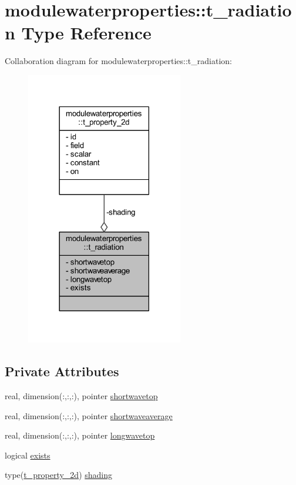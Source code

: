 \hypertarget{structmodulewaterproperties_1_1t__radiation}{}\section{modulewaterproperties\+:\+:t\+\_\+radiation Type Reference}
\label{structmodulewaterproperties_1_1t__radiation}


Collaboration diagram for modulewaterproperties\+:\+:t\+\_\+radiation\+:\nopagebreak
\begin{figure}[H]
\begin{center}
\leavevmode
\includegraphics[width=194pt]{structmodulewaterproperties_1_1t__radiation__coll__graph}
\end{center}
\end{figure}
\subsection*{Private Attributes}
\begin{DoxyCompactItemize}
\item 
real, dimension(\+:,\+:,\+:), pointer \mbox{\hyperlink{structmodulewaterproperties_1_1t__radiation_a0882477590ba0c077278a79f3d04169e}{shortwavetop}}
\item 
real, dimension(\+:,\+:,\+:), pointer \mbox{\hyperlink{structmodulewaterproperties_1_1t__radiation_af8206a9b22ff7f5ea34dea55e8429883}{shortwaveaverage}}
\item 
real, dimension(\+:,\+:,\+:), pointer \mbox{\hyperlink{structmodulewaterproperties_1_1t__radiation_ad6da20b6ec082bc91742648ee514c396}{longwavetop}}
\item 
logical \mbox{\hyperlink{structmodulewaterproperties_1_1t__radiation_abd41d479c45628ff6d60f18fb53b3fb6}{exists}}
\item 
type(\mbox{\hyperlink{structmodulewaterproperties_1_1t__property__2d}{t\+\_\+property\+\_\+2d}}) \mbox{\hyperlink{structmodulewaterproperties_1_1t__radiation_ae82a010f10d2ba179a712dce7d50d93d}{shading}}
\end{DoxyCompactItemize}


